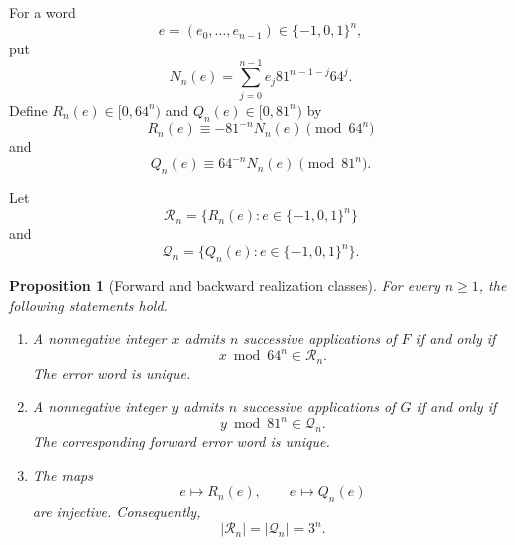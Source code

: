\documentclass[11pt]{article}
\newtheorem{proposition}[theorem]{Proposition}
\theoremstyle{remark}
\newcommand{\Rset}{\mathcal{R}}
\newcommand{\Qset}{\mathcal{Q}}
\begin{document}
For a word
\[
e=(e_0,\ldots,e_{n-1})\in\{-1,0,1\}^n,
\]
put
\[
N_n(e)
=
\sum_{j=0}^{n-1}
e_j81^{n-1-j}64^j.
\]
Define \(R_n(e)\in[0,64^n)\) and \(Q_n(e)\in[0,81^n)\) by
\[
R_n(e)
\equiv
-81^{-n}N_n(e)
\pmod{64^n}
\]
and
\[
Q_n(e)
\equiv
64^{-n}N_n(e)
\pmod{81^n}.
\]

Let
\[
\Rset_n=\{R_n(e):e\in\{-1,0,1\}^n\}
\]
and
\[
\Qset_n=\{Q_n(e):e\in\{-1,0,1\}^n\}.
\]

\begin{proposition}[Forward and backward realization classes]
\label{prop:cylinders}
For every \(n\ge1\), the following statements hold.

\begin{enumerate}
\item A nonnegative integer \(x\) admits \(n\) successive applications of \(F\) if and only if
\[
x\bmod64^n\in\Rset_n.
\]
The error word is unique.

\item A nonnegative integer \(y\) admits \(n\) successive applications of \(G\) if and only if
\[
y\bmod81^n\in\Qset_n.
\]
The corresponding forward error word is unique.

\item The maps
\[
e\longmapsto R_n(e),
\qquad
e\longmapsto Q_n(e)
\]
are injective.  Consequently,
\[
|\Rset_n|=|\Qset_n|=3^n.
\]
\end{enumerate}
\end{proposition}
\end{document}
